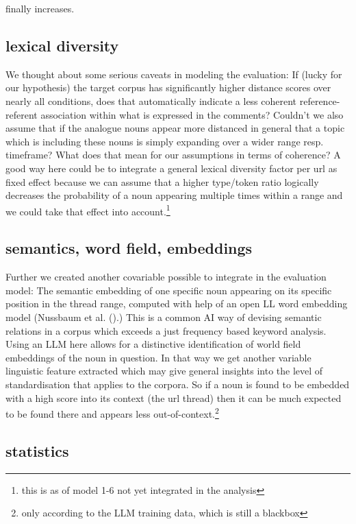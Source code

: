 \documentclass[
  12pt,
  oneside]{book}
\begin{document}
finally increases.

\subsection{lexical diversity}\label{lexical-diversity}

We thought about some serious caveats in modeling the evaluation: If (lucky for our hypothesis) the target corpus has significantly higher distance scores over nearly all conditions, does that automatically indicate a less coherent reference-referent association within what is expressed in the comments? Couldn't we also assume that if the analogue nouns appear more distanced in general that a topic which is including these nouns is simply expanding over a wider range resp. timeframe? What does that mean for our assumptions in terms of coherence? A good way here could be to integrate a general lexical diversity factor per url as fixed effect because we can assume that a higher type/token ratio logically decreases the probability of a noun appearing multiple times within a range and we could take that effect into account.\footnote{this is as of model 1-6 not yet integrated in the analysis}

\subsection{semantics, word field, embeddings}\label{semantics-word-field-embeddings}

Further we created another covariable possible to integrate in the evaluation model: The semantic embedding of one specific noun appearing on its specific position in the thread range, computed with help of an open LL word embedding model (Nussbaum et al. ().) This is a common AI way of devising semantic relations in a corpus which exceeds a just frequency based keyword analysis. Using an LLM here allows for a distinctive identification of world field embeddings of the noun in question. In that way we get another variable linguistic feature extracted which may give general insights into the level of standardisation that applies to the corpora. So if a noun is found to be embedded with a high score into its context (the url thread) then it can be much expected to be found there and appears less out-of-context.\footnote{only according to the LLM training data, which is still a blackbox}

\subsection{statistics}\label{statistics}
\end{document}
